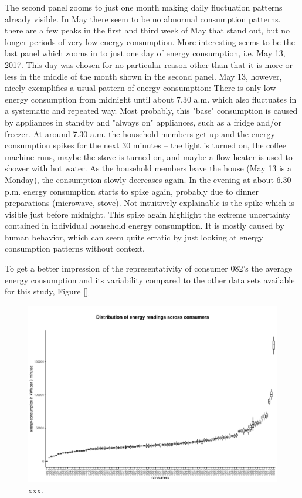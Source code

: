 The second panel zooms to just one month making daily fluctuation patterns already visible. In May there seem to be no abnormal consumption patterns. there are a few peaks in the first and third week of May that stand out, but no longer periods of very low energy consumption. More interesting seems to be the last panel which zooms in to just one day of energy consumption, i.e. May 13, 2017. This day was chosen for no particular reason other than that it is more or less in the middle of the month shown in the second panel. May 13, however, nicely exemplifies a usual pattern of energy consumption: There is only low energy consumption from midnight until about 7.30 a.m. which also fluctuates in a systematic and repeated way. Most probably, this "base" consumption is caused by appliances in standby and "always on" appliances, such as a fridge and/or freezer. At around 7.30 a.m. the household members get up and the energy consumption spikes for the next 30 minutes -- the light is turned on, the coffee machine runs, maybe the stove is turned on, and maybe a flow heater is used to shower with hot water. As the household members leave the house (May 13 is a Monday), the consumption slowly decreases again. In the evening at about 6.30 p.m. energy consumption starts to spike again, probably due to dinner preparations (microwave, stove). Not intuitively explainable is the spike which is visible just before midnight. This spike again highlight the extreme uncertainty contained in individual household energy consumption. It is mostly caused by human behavior, which can seem quite erratic by just looking at energy consumption patterns without context.

To get a better impression of the representativity of consumer 082's the average energy consumption and its variability compared to the other data sets available for this study, Figure \ref{}

\begin{figure}[h]
 \centering
\includegraphics[width=\textwidth]{thesis/graphs/consumer_boxplots_energy.pdf}
\caption[xxx]{xxx. \quantnet}
\label{Fig:boxplots_energy}
\end{figure}

